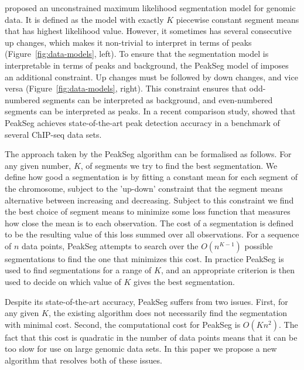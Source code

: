 \documentclass[aoas]{imsart}
\begin{document}

\citet{cleynen2013segmentation} proposed an unconstrained maximum
likelihood segmentation model for genomic data. It is defined as the
model with exactly $K$ piecewise constant segment means that has
highest likelihood value.  However, it sometimes has several
consecutive up changes, which makes it non-trivial to interpret in
terms of peaks (Figure~\ref{fig:data-models}, left). To ensure that
the segmentation model is interpretable in terms of peaks and
background, the PeakSeg model of \citet{HOCKING-PeakSeg} imposes an
additional constraint. Up changes must be followed by down changes,
and vice versa (Figure~\ref{fig:data-models}, right). This constraint
ensures that odd-numbered segments can be interpreted as background,
and even-numbered segments can be interpreted as peaks.
In a
recent comparison study, \citet{HOCKING2016-chipseq} showed that
PeakSeg achieves state-of-the-art peak detection accuracy in a
benchmark of several ChIP-seq data sets.

The approach taken by the PeakSeg algorithm can be formalised as follows. For any given number, $K$,
of segments we try to find the best segmentation. We define how good a segmentation is by fitting
a constant mean for each segment of the chromosome, subject to the 'up-down' constraint that
the segment means alternative between increasing and decreasing. Subject to this constraint we find the
best choice of segment means to minimize some loss function that measures how close the mean is to each 
observation. The cost of a segmentation is defined to be the resulting value of this loss summed over 
all observations. For a sequence of $n$ data points, PeakSeg attempts to search over the $O(n^{K-1})$ 
possible segmentations to find the one that minimizes this cost. In practice PeakSeg is used to find segmentations
for a range of $K$, and an appropriate criterion is then used to decide on which value of $K$ gives the best 
segmentation.

Despite its state-of-the-art accuracy, PeakSeg suffers from two
issues. First, for any given $K$, the existing algorithm does not
necessarily find the segmentation with minimal cost. Second, the
computational cost for PeakSeg is $O(Kn^2)$. The fact that this cost
is quadratic in the number of data points means that it can be too
slow for use on large genomic data sets. In this paper we propose a
new algorithm that resolves both of these issues.
\end{document}
